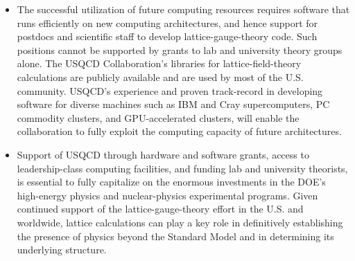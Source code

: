 \begin{itemize}
\item The successful utilization of future computing resources requires software that runs efficiently on new computing architectures, and hence support for postdocs and scientific staff to develop lattice-gauge-theory code.  Such positions cannot be supported by grants to lab and university theory groups alone.   The USQCD Collaboration's libraries for lattice-field-theory calculations are publicly available and are used by most of the U.S. community.  USQCD's experience and proven track-record in developing software for diverse machines such as IBM and Cray supercomputers, PC commodity clusters, and GPU-accelerated clusters, will enable the collaboration to fully exploit the computing capacity of future architectures.  

\item Support of USQCD through hardware and software grants, access to leadership-class computing facilities, and funding lab and university theorists, is essential to fully capitalize on the enormous investments in the DOE's high-energy physics and nuclear-physics experimental programs.  Given continued support of the lattice-gauge-theory effort in the U.S. and worldwide, lattice calculations can play a key role in definitively establishing the presence of physics beyond the Standard Model and in determining its underlying structure.

\end{itemize}


